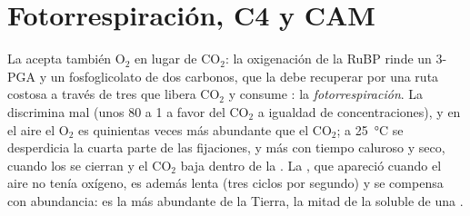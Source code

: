 \section{Fotorrespiración, C4 y CAM}

\begin{proposition}\label{prop:b1:photosynthesis:photorespiration}
La  acepta también $\mathrm{O_2}$ en lugar de $\mathrm{CO_2}$: la
oxigenación de la RuBP rinde un 3-PGA y un fosfoglicolato de dos carbonos,
que la  debe recuperar por una ruta costosa a través de tres 
que libera $\mathrm{CO_2}$ y consume : la
\emph{fotorrespiración}. La  discrimina mal (unos \qty{80}{} a 1 a
favor del $\mathrm{CO_2}$ a igualdad de concentraciones), y en el aire el
$\mathrm{O_2}$ es quinientas veces más abundante que el $\mathrm{CO_2}$; a
\qty{25}{\celsius} se desperdicia la cuarta parte de las fijaciones, y más
con tiempo caluroso y seco, cuando los  se cierran y el
$\mathrm{CO_2}$ baja dentro de la . La , que apareció cuando el
aire no tenía oxígeno, es además lenta (tres ciclos por segundo) y se
compensa con abundancia: es la  más abundante de la Tierra, la mitad
de la  soluble de una .
\end{proposition}

